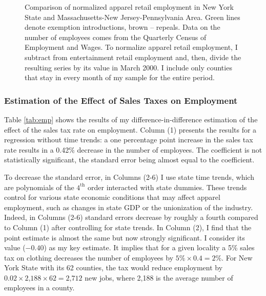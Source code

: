 \documentclass[12pt]{article}
\begin{document}
	\begin{figure}[t]
		\centering
		\caption{Comparison of normalized apparel retail employment in New York State and Massachusetts-New Jersey-Pennsylvania Area. Green lines denote exemption introductions, brown -- repeals. Data on the number of employees comes from the Quarterly Census of Employment and Wages. To normalize apparel retail employment, I subtract from entertainment retail employment and, then, divide the resulting series by its value in March 2000. I include only counties that stay in every month of my sample for the entire period.}
		\label{fig:emp}
	\end{figure}
	
	\subsubsection{Estimation of the Effect of Sales Taxes on Employment}
	
	
	Table \ref{tab:emp} shows the results of my difference-in-difference estimation of the effect of the sales tax rate on employment. Column (1) presents the results for a regression without time trends: a one  percentage point increase in the sales tax rate results in a 0.42\% decrease in the number of employees. The coefficient is not statistically significant, the standard error being almost equal to the coefficient. 
	
	To decrease the standard error, in Columns (2-6) I use state time trends, which are polynomials of the $4^{\text{th}}$ order interacted with state dummies. These trends control for various state economic conditions that may affect apparel employment, such as changes in state GDP or the unionization of the industry. Indeed, in Columns (2-6) standard errors decrease by roughly a fourth compared to Column (1) after controlling for state trends. In Column (2), I find that the point estimate is almost the same but now strongly significant. 
	I consider its value ($-0.40$) as my key estimate. It implies that for a given locality a 5\% sales tax on clothing decreases the number of employees by $5\% \times 0.4=2\%$. %
	For New York State with its 62 counties, the tax would reduce employment by $0.02 \times \text{2,188} \times 62=\text{2,712}$ new jobs, where 2,188 is the average number of employees in a county.
	
\end{document}
